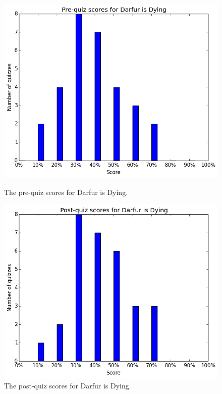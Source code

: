 			\begin{figure}[h] 
			\centering 
			\begin{minipage}[b]{0.45\linewidth}
			\includegraphics[height=0.33\textheight]{darfur_pre.png} 
			\caption{The pre-quiz scores for Darfur is Dying.}
			\end{minipage}
			\quad
			\begin{minipage}[b]{0.45\linewidth}
			\includegraphics[height=0.33\textheight]{darfur_post.png} 
			\caption{The post-quiz scores for Darfur is Dying.}
			\end{minipage}
			\end{figure}


